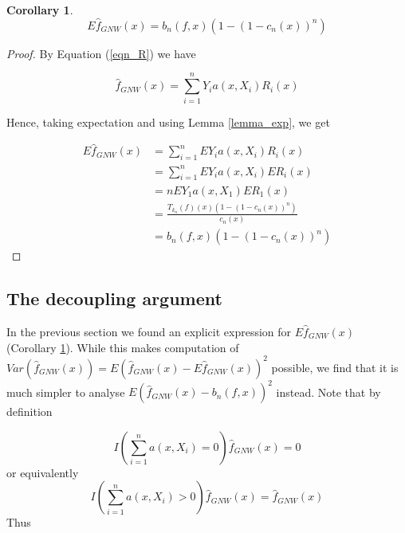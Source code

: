 \documentclass{article}
\newtheorem{corollary}[theorem]{Corollary}
\begin{document}
\begin{corollary}
\label{expectation_comp}
\begin{equation*}
    E\hat{f}_{GNW}(x)=b_n(f,x)(1-(1-c_n(x))^n)
\end{equation*}
\end{corollary}
\begin{proof}

By Equation (\ref{eqn_R}) we have

\begin{equation*}
    \hat{f}_{GNW}(x)=\sum_{i=1}^n Y_ia(x,X_i)R_i(x)
\end{equation*}

Hence, taking expectation and using Lemma  \ref{lemma_exp}, we get 

\begin{equation*}
\begin{split}
    E\hat{f}_{GNW}(x)&=\sum_{i=1}^nEY_ia(x,X_i)R_i(x)\\
    &=\sum_{i=1}^nEY_ia(x,X_i)ER_i(x)\\
    &=nEY_1a(x,X_1)ER_1(x)\\
    &=\frac{T_{k_n}(f)(x)(1-(1-c_n(x))^n)}{c_n(x)}\\
    &=b_n(f,x)(1-(1-c_n(x))^n)
\end{split}
\end{equation*}

\end{proof}



\subsection{The decoupling argument}
In the previous section we found an explicit expression for $E\hat{f}_{GNW}(x)$ (Corollary \ref{expectation_comp}). While this makes computation of $Var(\hat{f}_{GNW}(x))=E(\hat{f}_{GNW}(x)-E\hat{f}_{GNW}(x))^2$ possible, we find that it is much simpler to analyse $E(\hat{f}_{GNW}(x)-b_n(f,x))^2$ instead. Note that by definition

\begin{equation}
\label{gnw_no_edges}
    I(\sum_{i=1}^na(x,X_i)=0)\hat{f}_{GNW}(x)=0
\end{equation}
or equivalently
\begin{equation}
\label{gnw_edges}
   I(\sum_{i=1}^na(x,X_i)>0)\hat{f}_{GNW}(x)=\hat{f}_{GNW}(x) 
\end{equation}
Thus 
\end{document}
